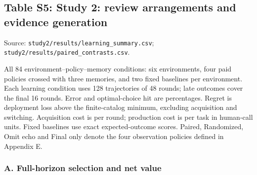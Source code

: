 \subsection*{Table S5: Study 2: review arrangements and evidence generation}
\label{supp:S5}
{\footnotesize Source: \texttt{study2/results/learning\_summary.csv}; \texttt{study2/results/paired\_contrasts.csv}.}\par All 84 environment--policy--memory conditions: six environments, four paid policies crossed with three memories, and two fixed baselines per environment. Each learning condition uses 128 trajectories of 48 rounds; late outcomes cover the final 16 rounds. Error and optimal-choice hit are percentages. Regret is deployment loss above the finite-catalog minimum, excluding acquisition and switching. Acquisition cost is per round; production cost is per task in human-call units. Fixed baselines use exact expected-outcome scores. Paired, Randomized, Omit echo and Final only denote the four observation policies defined in Appendix E.

\subsubsection*{A. Full-horizon selection and net value}
\begingroup\footnotesize\setlength{\tabcolsep}{4pt}

